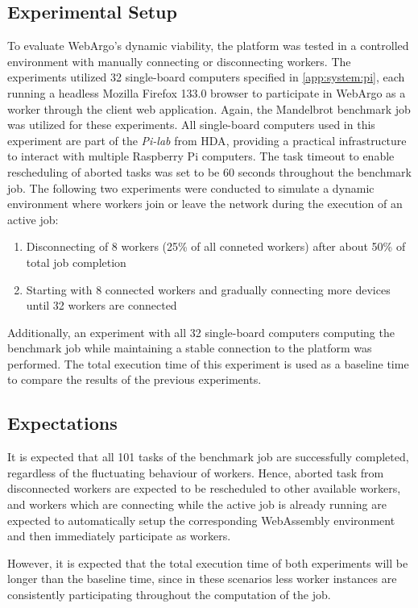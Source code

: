 \subsection{Experimental Setup}
To evaluate WebArgo's dynamic viability, the platform was tested in a controlled environment with manually connecting or disconnecting workers. The experiments utilized 32 single-board computers specified in \autoref{app:system:pi}, each running a headless Mozilla Firefox 133.0 \cite{background:firefox2} browser to participate in WebArgo as a worker through the client web application. Again, the Mandelbrot benchmark job was utilized for these experiments. All single-board computers used in this experiment are part of the \emph{Pi-lab} from \ac{HDA}, providing a practical infrastructure to interact with multiple Raspberry Pi computers. The task timeout to enable rescheduling of aborted tasks was set to be 60 seconds throughout the benchmark job. The following two experiments were conducted to simulate a dynamic environment where workers join or leave the network during the execution of an active job:
\begin{enumerate}
    \item Disconnecting of 8 workers (25\% of all conneted workers) after about 50\% of total job completion 
    \item Starting with 8 connected workers and gradually connecting more devices until 32 workers are connected
\end{enumerate}
Additionally, an experiment with all 32 single-board computers computing the benchmark job while maintaining a stable connection to the platform was performed. The total execution time of this experiment is used as a baseline time to compare the results of the previous experiments.

\subsection{Expectations}
It is expected that all 101 tasks of the benchmark job are successfully completed, regardless of the fluctuating behaviour of workers. Hence, aborted task from disconnected workers are expected to be rescheduled to other available workers, and workers which are connecting while the active job is already running are expected to automatically setup the corresponding WebAssembly environment and then immediately participate as workers.

However, it is expected that the total execution time of both experiments will be longer than the baseline time, since in these scenarios less worker instances are consistently participating throughout the computation of the job. 

